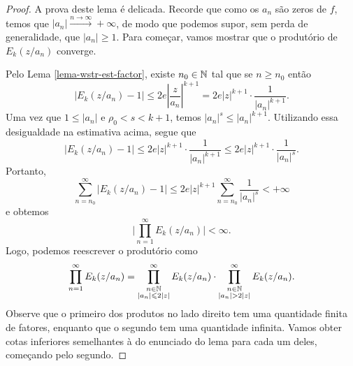     \begin{proof}
        A prova deste lema é delicada. Recorde que como os $a_n$ são
        zeros de $f$, temos que $|a_n| \xrightarrow{n\to\infty} +\infty$,
        de modo que podemos supor, sem perda de generalidade, que $|a_n| \geq 1$.
        Para começar, vamos mostrar que o produtório de $E_k(z/a_n)$ converge.
        
        Pelo Lema \ref{lema-wstr-est-factor}, existe $n_0\in\mathbb{N}$ tal que se $n\geq n_0$
        então
        \begin{equation*}
            \left| E_k(z/a_n) - 1 \right| 
            \leq 2e\left| \frac{z}{a_n} \right|^{k+1}
            = 2e|z|^{k+1}\cdot\frac{1}{|a_n|^{k+1}}.
        \end{equation*}
        Uma vez que $1 \leq |a_n|$ e $\rho_0 < s < k+1$, temos 
        $|a_n|^s \leq |a_n|^{k+1}$. Utilizando essa desigualdade na estimativa acima,
        segue que
        \begin{equation*}
            \left| E_k(z/a_n) - 1 \right|
            \leq 2e|z|^{k+1}\cdot\frac{1}{|a_n|^{k+1}}
            \leq 2e|z|^{k+1}\cdot\frac{1}{|a_n|^s}.
        \end{equation*}
        Portanto,
        \begin{equation*}
            \sum_{n=n_0}^{\infty} \left| E_k(z/a_n) - 1 \right|
            \leq 2e|z|^{k+1} \sum_{n=n_0}^{\infty} \frac{1}{|a_n|^s} < +\infty
        \end{equation*}
        e obtemos
        \begin{equation*}
            \Big |\prod_{n=1}^{\infty} E_k(z/a_n) \Big | < \infty.
        \end{equation*}
        Logo, podemos reescrever o produtório como
        \begin{equation*}
            \prod_{n=1}^{\infty} E_k(z/a_n)
            = \prod_{\substack{n\in\mathbb{N} \\ |a_n| \leqslant 2|z|}}^{\infty} E_k(z/a_n) \cdot 
            \prod_{\substack{n\in\mathbb{N} \\ |a_n| > 2|z|}}^{\infty} E_k(z/a_n).
        \end{equation*}
        Observe que o primeiro dos produtos no lado direito tem uma quantidade finita
        de fatores, enquanto que o segundo tem uma quantidade infinita. Vamos obter
        cotas inferiores semelhantes à do enunciado do lema para cada um deles,
        começando pelo segundo.
        

\end{proof}
